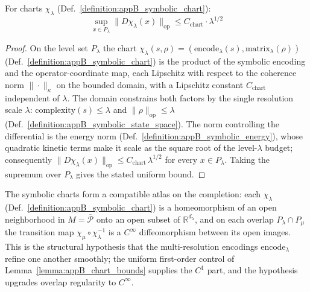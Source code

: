 \begin{lemma}
\label{lemma:appB_chart_bounds}
For charts $\chi_\lambda$ (Def.~\ref{definition:appB_symbolic_chart}):
\[
\sup_{x \in P_\lambda} \|D\chi_\lambda(x)\|_{\text{op}} \leq C_{\text{chart}} \cdot \lambda^{1/2}
\]
\end{lemma}
\begin{proof}
\label{proof:appB_chart_bounds}
\leavevmode
On the level set $P_\lambda$ the chart $\chi_\lambda(s,\rho)=(\text{encode}_\lambda(s),\text{matrix}_\lambda(\rho))$ (Def.~\ref{definition:appB_symbolic_chart}) is the product of the symbolic encoding and the operator-coordinate map, each Lipschitz with respect to the coherence norm $\|\cdot\|_\kappa$ on the bounded domain, with a Lipschitz constant $C_{\text{chart}}$ independent of $\lambda$. The domain constrains both factors by the single resolution scale $\lambda$: $\text{complexity}(s)\le\lambda$ and $\|\rho\|_{\text{op}}\le\lambda$ (Def.~\ref{definition:appB_symbolic_state_space}). The norm controlling the differential is the energy norm (Def.~\ref{definition:appB_symbolic_energy}), whose quadratic kinetic terms make it scale as the square root of the level-$\lambda$ budget; consequently $\|D\chi_\lambda(x)\|_{\text{op}}\le C_{\text{chart}}\,\lambda^{1/2}$ for every $x\in P_\lambda$. Taking the supremum over $P_\lambda$ gives the stated uniform bound.
\end{proof}

\begin{assumption}
\label{assumption:appB_chart_compatibility}
The symbolic charts form a compatible atlas on the completion: each $\chi_\lambda$ (Def.~\ref{definition:appB_symbolic_chart}) is a homeomorphism of an open neighborhood in $M=\overline{\mathcal{P}}$ onto an open subset of $\mathbb{R}^{d_\lambda}$, and on each overlap $P_\lambda\cap P_\mu$ the transition map $\chi_\mu\circ\chi_\lambda^{-1}$ is a $C^\infty$ diffeomorphism between its open images. This is the structural hypothesis that the multi-resolution encodings $\text{encode}_\lambda$ refine one another smoothly; the uniform first-order control of Lemma~\ref{lemma:appB_chart_bounds} supplies the $C^1$ part, and the hypothesis upgrades overlap regularity to $C^\infty$.
\end{assumption}

